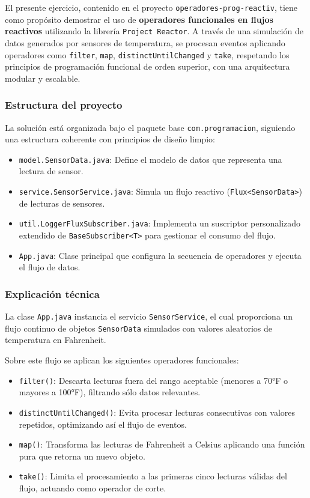 El presente ejercicio, contenido en el proyecto \texttt{operadores-prog-reactiv}, tiene como propósito demostrar el uso de \textbf{operadores funcionales en flujos reactivos} utilizando la librería \texttt{Project Reactor}. A través de una simulación de datos generados por sensores de temperatura, se procesan eventos aplicando operadores como \texttt{filter}, \texttt{map}, \texttt{distinctUntilChanged} y \texttt{take}, respetando los principios de programación funcional de orden superior, con una arquitectura modular y escalable.

\subsubsection*{Estructura del proyecto}

La solución está organizada bajo el paquete base \texttt{com.programacion}, siguiendo una estructura coherente con principios de diseño limpio:

\begin{itemize}
  \item \texttt{model.SensorData.java}: Define el modelo de datos que representa una lectura de sensor.
  \item \texttt{service.SensorService.java}: Simula un flujo reactivo (\texttt{Flux<SensorData>}) de lecturas de sensores.
  \item \texttt{util.LoggerFluxSubscriber.java}: Implementa un suscriptor personalizado extendido de \texttt{BaseSubscriber<T>} para gestionar el consumo del flujo.
  \item \texttt{App.java}: Clase principal que configura la secuencia de operadores y ejecuta el flujo de datos.
\end{itemize}

\subsubsection*{Explicación técnica}

La clase \texttt{App.java} instancia el servicio \texttt{SensorService}, el cual proporciona un flujo continuo de objetos \texttt{SensorData} simulados con valores aleatorios de temperatura en Fahrenheit.

Sobre este flujo se aplican los siguientes operadores funcionales:

\begin{itemize}
  \item \texttt{filter()}: Descarta lecturas fuera del rango aceptable (menores a 70°F o mayores a 100°F), filtrando sólo datos relevantes.
  
  \item \texttt{distinctUntilChanged()}: Evita procesar lecturas consecutivas con valores repetidos, optimizando así el flujo de eventos.
  
  \item \texttt{map()}: Transforma las lecturas de Fahrenheit a Celsius aplicando una función pura que retorna un nuevo objeto.
  
  \item \texttt{take()}: Limita el procesamiento a las primeras cinco lecturas válidas del flujo, actuando como operador de corte.
\end{itemize}

